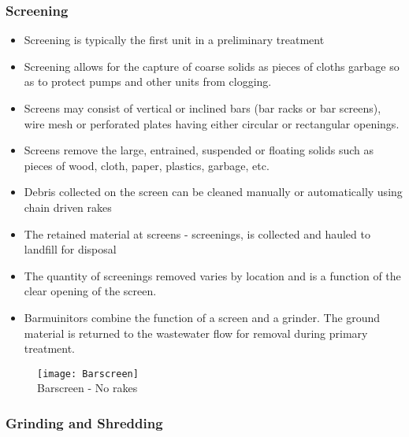\documentclass{article}
\begin{document}
		\subsubsection{Screening}
					\begin{itemize}
						\item Screening is typically the first unit in a preliminary treatment
						\item Screening allows for the capture of coarse solids as pieces of cloths garbage so as to protect pumps and other units from clogging. 
						\item Screens may consist of vertical or inclined bars (bar racks or bar screens), wire mesh or perforated plates having either circular or rectangular openings. 
						\item Screens remove the large, entrained, suspended or floating solids such as pieces of wood, cloth, paper, plastics, garbage, etc.
						\item Debris collected on the screen can be cleaned manually or automatically using chain driven rakes 
						\item The retained material at screens - screenings, is collected and hauled to landfill for disposal
						\item The quantity of screenings removed varies by location and is a function of the clear opening of the screen.
						\item Barmuinitors combine the function of a screen and a grinder.  The ground material is returned to the wastewater flow for removal during primary treatment.
					\end{itemize}

\begin{figure}
\begin{center}
    \texttt{[image: Barscreen]}\\

Barscreen - No rakes
\end{center}
  \end{figure}
  

		\subsubsection{Grinding and Shredding}
\end{document}
